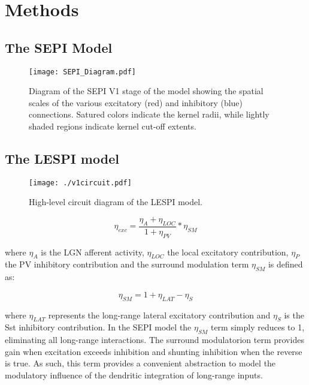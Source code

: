 \section{Methods}

\subsection{The SEPI Model}

\begin{figure}
	\centering
        \texttt{[image: SEPI\_Diagram.pdf]}
	\caption{Diagram of the SEPI V1 stage of the model showing the
          spatial scales of the various excitatory (red) and
          inhibitory (blue) connections. Satured colors indicate the
          kernel radii, while lightly shaded regions indicate kernel
          cut-off extents.}
	\label{SCALDiagram}
\end{figure}


\subsection{The LESPI model}

\begin{figure}
	\centering
	\texttt{[image: ./v1circuit.pdf]}
	\caption[]{High-level circuit diagram of the LESPI model.}
    \label{circuit_diagram}
\end{figure}


\begin{equation}
  \eta_{exc} = \frac{\eta_{A} + \eta_{LOC}}{1 + \eta_{PV}} * \eta_{SM}
\end{equation}

where $\eta_{A}$ is the LGN afferent activity, $\eta_{LOC}$ the local
excitatory contribution, $\eta_{P}$ the PV inhibitory contribution
and the surround modulation term $\eta_{SM}$ is defined as:

\begin{equation}
  \eta_{SM} = 1 + \eta_{LAT} - \eta_{S}
\end{equation}

where $\eta_{LAT}$ represents the long-range lateral excitatory
contribution and $\eta_{S}$ is the Sst inhibitory contribution. In the
SEPI model the $\eta_{SM}$ term simply reduces to 1, eliminating all
long-range interactions. The surround modulatorion term provides gain
when excitation exceeds inhibition and shunting inhibition when the
reverse is true. As such, this term provides a convenient abstraction
to model the modulatory influence of the dendritic integration of
long-range inputs.

